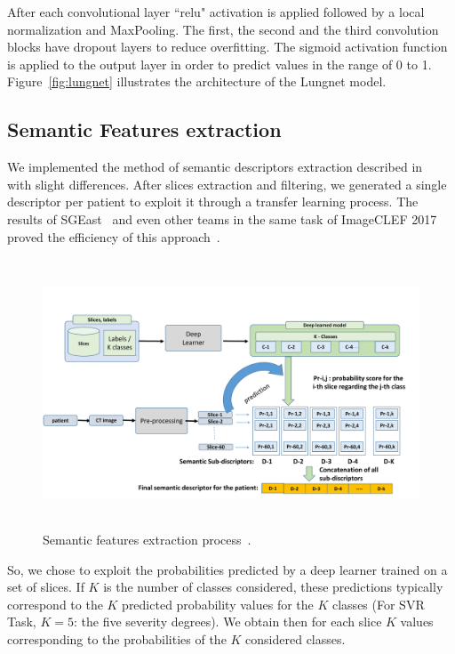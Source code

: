 \documentclass{llncs}
\begin{document}
After each convolutional layer ``relu" activation is applied followed by a local normalization and MaxPooling. The first, the second and the third convolution blocks have dropout layers to reduce overfitting. The sigmoid activation function is applied to the output layer in order to predict values in the range of 0 to 1.\\

Figure~\ref{fig:lungnet} illustrates the architecture of the Lungnet model.





\subsection{Semantic Features extraction}
\label{semDesc}
We implemented the method of semantic descriptors extraction described in~\cite{HamadiY18} with slight differences. After slices extraction and filtering, we generated a single descriptor per patient to exploit it through a transfer learning process. The results of SGEast~\cite{sgeast17} and even other teams in the same task of ImageCLEF 2017 proved the efficiency of this approach~\cite{sgeast17,HamadiY18}.

\begin{figure}[!ht]
\includegraphics[width=\textwidth,height=8cm]{semanticFeatures.pdf}
\caption{Semantic features extraction process~\cite{HamadiY18}.} 
\label{fig:semanticFeatures}
\end{figure}

So, we chose to exploit the probabilities predicted by a deep learner trained on a set of slices. If $K$ is the number of classes considered, these predictions typically correspond to the $K$ predicted probability values ​​for the $K$ classes (For SVR Task, $K=5$: the five severity degrees). We obtain then for each slice $K$ values ​​corresponding to the probabilities of the $K$ considered classes.\\
\end{document}
